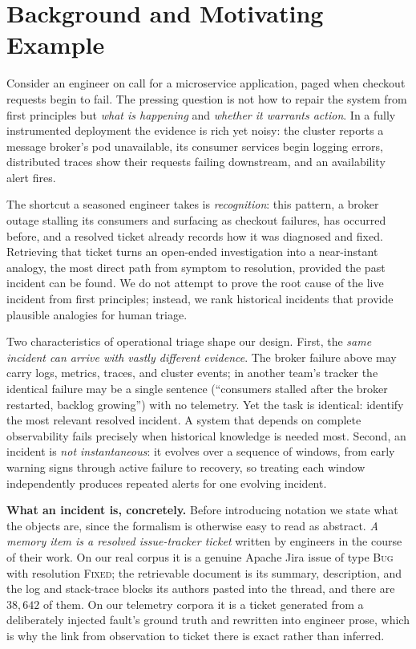 \section{Background and Motivating Example}
\label{sec:background}

Consider an engineer on call for a microservice application, paged when checkout requests begin to fail. The pressing question is not how to repair the
system from first principles but \emph{what is happening} and \emph{whether it
warrants action}. In a fully instrumented deployment the evidence is rich yet noisy: the cluster reports a message broker's pod unavailable, its consumer services begin logging errors, distributed traces show their requests failing downstream, and an availability alert fires.

The shortcut a seasoned engineer takes is \emph{recognition}: this pattern, a broker outage stalling its consumers and surfacing as checkout failures, has occurred before, and a resolved ticket already records how it was diagnosed and fixed. Retrieving that ticket turns an open-ended investigation into a near-instant analogy, the most direct path from symptom to resolution, provided the past incident can be found. We do not attempt to prove the root cause of the live incident from first principles; instead, we rank historical incidents that provide plausible analogies for human triage.

Two characteristics of operational triage shape our design. First, the \emph{same incident can arrive with vastly different evidence}. The broker failure above may carry logs, metrics, traces, and cluster events; in another team's tracker the identical failure may be a single sentence (``consumers stalled after the broker restarted, backlog growing'') with no telemetry. Yet the task is identical: identify the most relevant resolved incident. A system that depends on complete observability fails precisely when historical knowledge is needed most. Second, an incident is \emph{not instantaneous}: it evolves over a sequence of windows, from early warning signs through active failure to recovery, so treating each window independently produces repeated alerts for one evolving incident.

\smallskip
\noindent\textbf{What an incident is, concretely.} Before introducing notation we
state what the objects are, since the formalism is otherwise easy to read as
abstract. \emph{A memory item is a resolved issue-tracker ticket} written by
engineers in the course of their work. On our real corpus it is a genuine Apache
Jira issue of type \textsc{Bug} with resolution \textsc{Fixed}; the retrievable
document is its summary, description, and the log and stack-trace blocks its
authors pasted into the thread, and there are $38{,}642$ of them. On our
telemetry corpora it is a ticket generated from a deliberately injected fault's
ground truth and rewritten into engineer prose, which is why the link from
observation to ticket there is exact rather than inferred.

